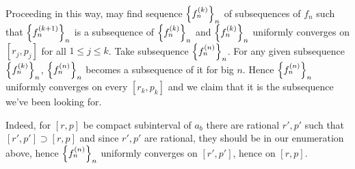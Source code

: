 \documentclass[10pt]{article} %
\begin{document}
\begin{enumerate}[(1)]
	Proceeding in this way, may find sequence $\left\{f^{(k)}_n\right\}_n$ of subsequences of $f_n$ such that $\left\{f^{(k+1)}_n\right\}_n$ 
	is a subsequence of $\left\{f^{(k)}_n\right\}_n$ and $\left\{f^{(k)}_n\right\}_n$ uniformly converges on 
	$[r_j,p_j]$ for all $1\leq j\leq k$. Take subsequence $\left\{f^{(n)}_n\right\}_n$. For any given subsequence 
	$\left\{f^{(k)}_n\right\}_n$, $\left\{f^{(n)}_n\right\}_n$ becomes a subsequence of it for big $n$. Hence
	$\left\{f^{(n)}_n\right\}_n$ uniformly converges on every $[r_k,p_k]$ and we claim that it is the subsequence we've been looking for.

	Indeed, for $[r,p]$ be compact subinterval of $a_b$ there are rational $r', p'$ such that $[r',p']\supset[r,p]$ and
	since $r',p'$ are rational, they should be in our enumeration above, hence 
	$\left\{f^{(n)}_n\right\}_n$ uniformly converges on $[r',p']$, hence on $[r,p]$.
\end{enumerate}
\end{document}
